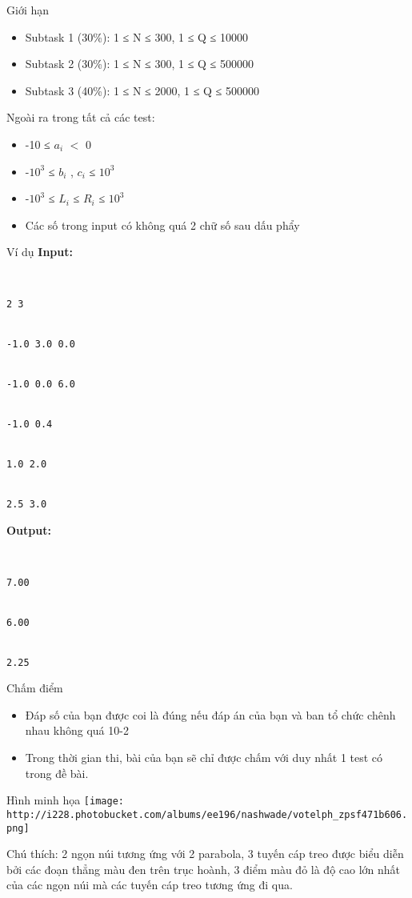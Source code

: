 Giới hạn
\begin{itemize}
	\item     Subtask 1 (30\%): 1 ≤ N ≤ 300, 1 ≤ Q ≤ 10000   
	\item     Subtask 2 (30\%): 1 ≤ N ≤ 300, 1 ≤ Q ≤ 500000   
	\item     Subtask 3 (40\%): 1 ≤ N ≤ 2000, 1 ≤ Q ≤ 500000   
\end{itemize}

   Ngoài ra trong tất cả các test:  
\begin{itemize}
	\item     -10 ≤ $a_{i}$    $<$ 0   
	\item     -$10^{3}$    ≤ $b_{i}$    , $c_{i}$    ≤ $10^{3}$
	\item     -$10^{3}$    ≤ $L_{i}$    ≤ $R_{i}$    ≤ $10^{3}$
	\item     Các số trong input có không quá 2 chữ số sau dấu phẩy   
\end{itemize}
Ví dụ
\textbf{    Input:   }
\begin{verbatim}


2 3


-1.0 3.0 0.0


-1.0 0.0 6.0


-1.0 0.4


1.0 2.0


2.5 3.0\end{verbatim}

\textbf{    Output:   }
\begin{verbatim}


7.00


6.00


2.25\end{verbatim}
Chấm điểm
\begin{itemize}
	\item     Đáp số của bạn được coi là đúng nếu đáp án của bạn và ban tổ chức chênh nhau không quá 10-2   
	\item     Trong thời gian thi, bài của bạn sẽ chỉ được chấm với duy nhất 1 test có trong đề bài.   
\end{itemize}
Hình minh họa
\texttt{[image: http://i228.photobucket.com/albums/ee196/nashwade/votelph\_zpsf471b606.png]}

Chú thích: 2 ngọn núi tương ứng với 2 parabola, 3 tuyến cáp treo được biểu diễn bởi các đoạn thẳng màu đen trên trục hoành, 3 điểm màu đỏ là độ cao lớn nhất của các ngọn núi mà các tuyến cáp treo tương ứng đi qua.